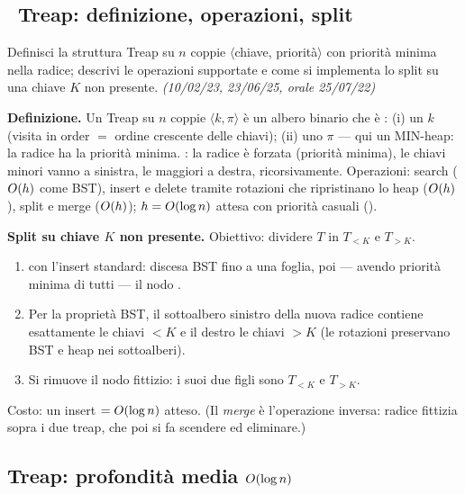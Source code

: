 \subsection*{\hot\ Treap: definizione, operazioni, split}

\begin{domanda}
Definisci la struttura Treap su $n$ coppie $\langle$chiave, priorit\`a$\rangle$ con priorit\`a
minima nella radice; descrivi le operazioni supportate e come si implementa lo split su una chiave
$K$ non presente. \emph{(10/02/23, 23/06/25, orale 25/07/22)}
\end{domanda}

\textbf{Definizione.} Un Treap su $n$ coppie $\langle k,\pi\rangle$ \`e un albero binario che \`e
: (i) un  $k$ (visita in order $=$ ordine
crescente delle chiavi); (ii) uno  $\pi$ --- qui un MIN-heap:
la radice ha la priorit\`a minima. : la
radice \`e forzata (priorit\`a minima), le chiavi minori vanno a sinistra, le maggiori a destra,
ricorsivamente. Operazioni: search ($O\!\left(h\right)$ come BST), insert e delete tramite rotazioni che
ripristinano lo heap ($O\!\left(h\right)$), split e merge ($O\!\left(h\right)$); $h=O\!\left(\log n\right)$ attesa con priorit\`a
casuali ().

\textbf{Split su chiave $K$ non presente.} Obiettivo: dividere $T$ in $T_{<K}$ e $T_{>K}$.
\begin{enumerate}[leftmargin=1.8em,itemsep=1pt]
\item {} con l'insert standard: discesa
BST fino a una foglia, poi --- avendo priorit\`a minima di tutti --- il nodo .
\item Per la propriet\`a BST, il sottoalbero sinistro della nuova radice contiene esattamente le
chiavi $<K$ e il destro le chiavi $>K$ (le rotazioni preservano BST e heap nei sottoalberi).
\item Si rimuove il nodo fittizio: i suoi due figli sono $T_{<K}$ e $T_{>K}$.
\end{enumerate}
Costo: un insert $=O\!\left(\log n\right)$ atteso. (Il \emph{merge} \`e l'operazione inversa: radice fittizia
sopra i due treap, che poi si fa scendere ed eliminare.)

\subsection*{ Treap: profondit\`a media $O\!\left(\log n\right)$}

